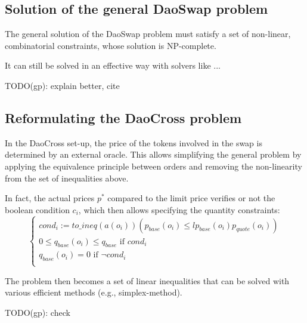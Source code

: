 \documentclass[11pt, reqno]{amsart}
\begin{document}
\subsection{Solution of the general DaoSwap problem}

The general solution of the DaoSwap problem must satisfy a set of non-linear,
combinatorial constraints, whose solution is NP-complete.

It can still be solved in an effective way with solvers like ...

TODO(gp): explain better, cite

\subsection{Reformulating the DaoCross problem}
In the DaoCross set-up, the price of the tokens involved in the swap is
determined by an external oracle.
This allows simplifying the general problem by applying the equivalence
principle between orders and removing the non-linearity from the set of
inequalities above.

In fact, the actual prices $p^*$ compared to the limit price verifies or not the
boolean condition $c_i$, which then allows specifying the quantity
constraints:
\begin{equation}
	\begin{cases}
		cond_i := \mathit{to\_ineq}(a(o_i))(p_{base}(o_i) \leq lp_{base}(o_i) p_{quote}(o_i)) \\
		0 \le q_{base}(o_i) \le q_{base} \text{ if } cond_i                                   \\
		q_{base}(o_i) = 0 \text{ if } \lnot cond_i                                            \\
	\end{cases}
\end{equation}

The problem then becomes a set of linear inequalities that can be solved with
various efficient methods (e.g., simplex-method).

TODO(gp): check



\end{document}

